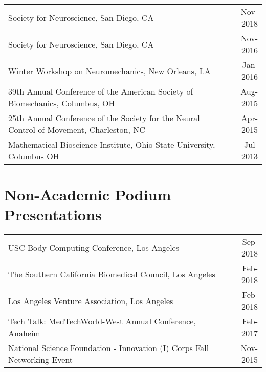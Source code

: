 \documentclass[10pt,a4paper]{article}
\begin{document}
  \vspace*{1mm}\noindent\begin{tabularx}{17cm}{X r}

    Society for Neuroscience, San Diego, CA & Nov-2018 \\ %
    Society for Neuroscience, San Diego, CA& Nov-2016 \\ 
    Winter Workshop on Neuromechanics, New Orleans, LA & Jan-2016 \\ %
    39th Annual Conference of the American Society of Biomechanics, Columbus, OH & Aug-2015 \\
    25th Annual Conference of the Society for the Neural Control of Movement, Charleston, NC & Apr-2015 \\
    Mathematical Bioscience Institute, Ohio State University, Columbus OH & Jul-2013\\
  \end{tabularx}


  \vspace*{2mm}\section*{Non-Academic Podium Presentations}

  \vspace*{1mm}\noindent\begin{tabularx}{17cm}{X r}
    USC Body Computing Conference, Los Angeles & Sep-2018\\ %
    The Southern California Biomedical Council, Los Angeles & Feb-2018 \\ %
    Los Angeles Venture Association, Los Angeles & Feb-2018 \\%
    Tech Talk: MedTechWorld-West Annual Conference, Anaheim & Feb-2017\\
    National Science Foundation - Innovation (I) Corps Fall Networking Event & Nov-2015\\
  \end{tabularx}
\end{document}
